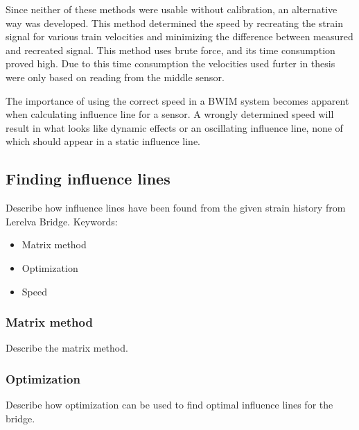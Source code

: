 Since neither of these methods were usable without calibration, an alternative way was developed. This method determined the speed by recreating the strain signal for various train velocities and minimizing the difference between measured and recreated signal. This method uses brute force, and its time consumption proved high. Due to this time consumption the velocities used furter in thesis were only based on reading from the middle sensor.

The importance of using the correct speed in a BWIM system becomes apparent when calculating influence line for a sensor. A wrongly determined speed will result in what looks like dynamic effects or an oscillating influence line, none of which should appear in a static influence line.

\subsection{Finding influence lines}
Describe how influence lines have been found from the given strain history from Lerelva Bridge.
Keywords:
\begin{itemize}
\item Matrix method
\item Optimization
\item Speed
\end{itemize}
\subsubsection{Matrix method}
Describe the matrix method.

\subsubsection{Optimization}
Describe how optimization can be used to find optimal influence lines for the bridge.

